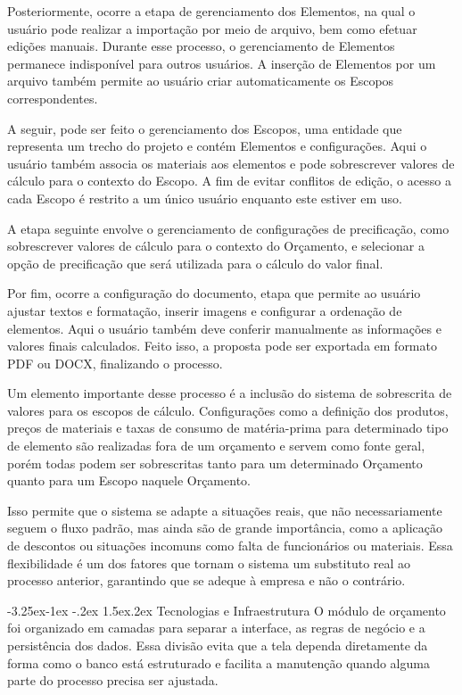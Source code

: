 \documentclass[
	article,
	12pt,				%
	oneside,
	a4paper,			%
	english,			%
	brazil				%
	]{abntex2}
\makeatletter
\renewcommand{\subsection}{%
  \@startsection{subsection}{2}{\z@}%
    {-3.25ex\@plus -1ex \@minus -.2ex}%
    {1.5ex\@plus .2ex}%
    {\normalfont\rmfamily\bfseries}%
}
\makeatother
\begin{document}
Posteriormente, ocorre a etapa de gerenciamento dos Elementos, na qual o
usuário pode realizar a importação por meio de arquivo, bem como efetuar
edições manuais. Durante esse processo, o gerenciamento de Elementos permanece
indisponível para outros usuários. A inserção de Elementos por um arquivo
também permite ao usuário criar automaticamente os Escopos correspondentes.

A seguir, pode ser feito o gerenciamento dos Escopos, uma entidade que
representa um trecho do projeto e contém Elementos e configurações. Aqui o
usuário também associa os materiais aos elementos e pode sobrescrever valores
de cálculo para o contexto do Escopo. A fim de evitar conflitos de edição, o
acesso a cada Escopo é restrito a um único usuário enquanto este estiver em
uso.

A etapa seguinte envolve o gerenciamento de configurações de precificação, como
sobrescrever valores de cálculo para o contexto do Orçamento, e selecionar a
opção de precificação que será utilizada para o cálculo do valor final.

Por fim, ocorre a configuração do documento, etapa que permite ao usuário
ajustar textos e formatação, inserir imagens e configurar a ordenação de
elementos. Aqui o usuário também deve conferir manualmente as informações e
valores finais calculados. Feito isso, a proposta pode ser exportada em formato
PDF ou DOCX, finalizando o processo.

Um elemento importante desse processo é a inclusão do sistema de sobrescrita de
valores para os escopos de cálculo. Configurações como a definição dos
produtos, preços de materiais e taxas de consumo de matéria-prima para
determinado tipo de elemento são realizadas fora de um orçamento e servem como
fonte geral, porém todas podem ser sobrescritas tanto para um determinado
Orçamento quanto para um Escopo naquele Orçamento.

Isso permite que o sistema se adapte a situações reais, que não necessariamente
seguem o fluxo padrão, mas ainda são de grande importância, como a aplicação de
descontos ou situações incomuns como falta de funcionários ou materiais. Essa
flexibilidade é um dos fatores que tornam o sistema um substituto real ao
processo anterior, garantindo que se adeque à empresa e não o contrário.

\subsection{Tecnologias e Infraestrutura}\label{sec:tecnologias}
O módulo de orçamento foi organizado em camadas para separar a interface, as
regras de negócio e a persistência dos dados. Essa divisão evita que a tela
dependa diretamente da forma como o banco está estruturado e facilita a
manutenção quando alguma parte do processo precisa ser ajustada.
\end{document}
